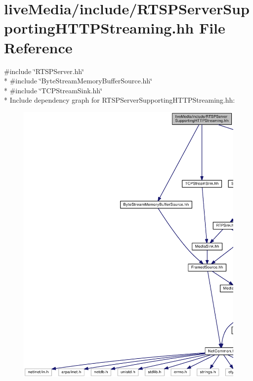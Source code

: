 \section{live\+Media/include/\+R\+T\+S\+P\+Server\+Supporting\+H\+T\+T\+P\+Streaming.hh File Reference}
\label{RTSPServerSupportingHTTPStreaming_8hh}
{\ttfamily \#include \char`\"{}R\+T\+S\+P\+Server.\+hh\char`\"{}}\\*
{\ttfamily \#include \char`\"{}Byte\+Stream\+Memory\+Buffer\+Source.\+hh\char`\"{}}\\*
{\ttfamily \#include \char`\"{}T\+C\+P\+Stream\+Sink.\+hh\char`\"{}}\\*
Include dependency graph for R\+T\+S\+P\+Server\+Supporting\+H\+T\+T\+P\+Streaming.\+hh\+:
\nopagebreak
\begin{figure}[H]
\begin{center}
\leavevmode
\includegraphics[width=350pt]{RTSPServerSupportingHTTPStreaming_8hh__incl}
\end{center}
\end{figure}
